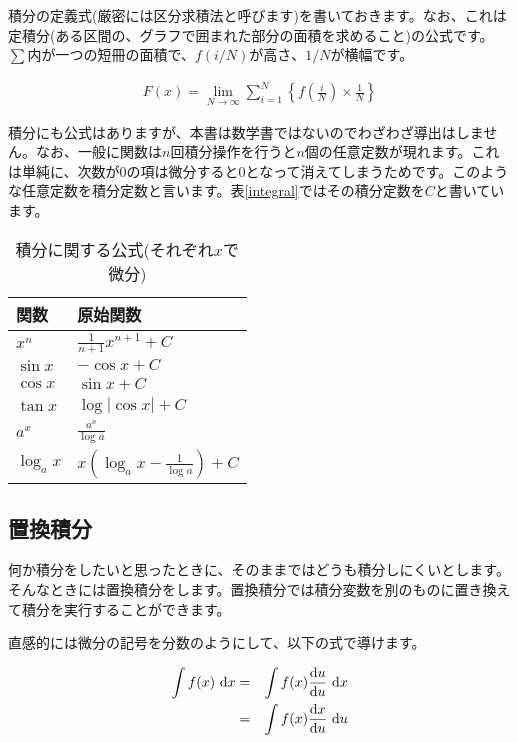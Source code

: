積分の定義式(厳密には区分求積法と呼びます)を書いておきます。なお、これは定積分(ある区間の、グラフで囲まれた部分の面積を求めること)の公式です。$\sum$内が一つの短冊の面積で、$f(i/N)$が高さ、$1/N$が横幅です。


\begin{eqnarray}
    F(x) = \lim_{N\to\infty}\sum_{i=1}^N \left\{f\left(\frac{i}{N}\right)\times \frac{1}{N}\right\}
\end{eqnarray}

積分にも公式はありますが、本書は数学書ではないのでわざわざ導出はしません。なお、一般に関数は$n$回積分操作を行うと$n$個の任意定数が現れます。これは単純に、次数が$0$の項は微分すると$0$となって消えてしまうためです。このような任意定数を積分定数と言います。表\ref{integral}ではその積分定数を$C$と書いています。

\begin{table}[htb]
 \begin{center}
  \caption{積分に関する公式(それぞれ$x$で微分)}
  \label{tab:integral}
  \begin{tabular}{l|l}
    \hline
    関数 & 原始関数 \\
    \hline \hline
    $x^n$ & $\frac{1}{n+1}x^{n+1} + C$ \\
    $\sin x$ & $-\cos x + C$ \\
    $\cos x$ & $\sin x + C$ \\
    $\tan x$ & $\log|\cos x| + C$ \\
    $a^x$ & $\frac{a^x}{\log a}$ \\
    $\log_ax$ & $x\left(\log_a x-\frac{1}{\log a}\right)+C$ \\
    
  \end{tabular}
 \end{center}
\end{table}




\subsection{置換積分}
\label{integral-replace}
何か積分をしたいと思ったときに、そのままではどうも積分しにくいとします。そんなときには置換積分をします。置換積分では積分変数を別のものに置き換えて積分を実行することができます。

直感的には微分の記号を分数のようにして、以下の式で導けます。

\begin{eqnarray}
    \int f(x) \ \mathrm{d}x &=& \int f(x) \frac{\mathrm{d}u}{\mathrm{d}u}\ \mathrm{d}x \notag \\
    &=&\int f(x) \frac{\mathrm{d}x}{\mathrm{d}u}\ \mathrm{d}u
\end{eqnarray}


